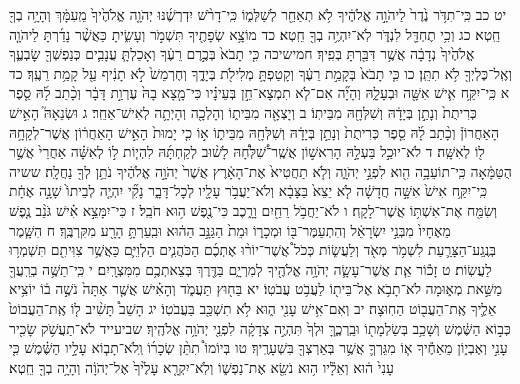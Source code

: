 \documentclass[twoside, openany, parskip=half, 11pt]{book}
\begin{document}
יט כב כִּֽי־תִדֹּ֥ר נֶ֙דֶר֙ לַיהֹוָ֣ה אֱלֹהֶ֔יךָ לֹ֥א תְאַחֵ֖ר לְשַׁלְּמ֑וֹ כִּֽי־דָרֹ֨שׁ יִדְרְשֶׁ֜נּוּ יְהֹוָ֤ה אֱלֹהֶ֙יךָ֙ מֵֽעִמָּ֔ךְ וְהָיָ֥ה בְךָ֖ חֵֽטְא׃ כג וְכִ֥י תֶחְדַּ֖ל לִנְדֹּ֑ר לֹֽא־יִהְיֶ֥ה בְךָ֖ חֵֽטְא׃ כד מוֹצָ֥א שְׂפָתֶ֖יךָ תִּשְׁמֹ֣ר וְעָשִׂ֑יתָ כַּאֲשֶׁ֨ר נָדַ֜רְתָּ לַיהֹוָ֤ה אֱלֹהֶ֙יךָ֙ נְדָבָ֔ה אֲשֶׁ֥ר דִּבַּ֖רְתָּ בְּפִֽיךָ׃
חמישיכה כִּ֤י תָבֹא֙ בְּכֶ֣רֶם רֵעֶ֔ךָ וְאָכַלְתָּ֧ עֲנָבִ֛ים כְּנַפְשְׁךָ֖ שׇׂבְעֶ֑ךָ וְאֶֽל־כֶּלְיְךָ֖ לֹ֥א תִתֵּֽן׃
כו כִּ֤י תָבֹא֙ בְּקָמַ֣ת רֵעֶ֔ךָ וְקָטַפְתָּ֥ מְלִילֹ֖ת בְּיָדֶ֑ךָ וְחֶרְמֵשׁ֙ לֹ֣א תָנִ֔יף עַ֖ל קָמַ֥ת רֵעֶֽךָ׃
כד א כִּֽי־יִקַּ֥ח אִ֛ישׁ אִשָּׁ֖ה וּבְעָלָ֑הּ וְהָיָ֞ה אִם־לֹ֧א תִמְצָא־חֵ֣ן בְּעֵינָ֗יו כִּי־מָ֤צָא בָהּ֙ עֶרְוַ֣ת דָּבָ֔ר וְכָ֨תַב לָ֜הּ סֵ֤פֶר כְּרִיתֻת֙ וְנָתַ֣ן בְּיָדָ֔הּ וְשִׁלְּחָ֖הּ מִבֵּיתֽוֹ׃ ב וְיָצְאָ֖ה מִבֵּית֑וֹ וְהָלְכָ֖ה וְהָיְתָ֥ה לְאִישׁ־אַחֵֽר׃ ג וּשְׂנֵאָהּ֮ הָאִ֣ישׁ הָאַחֲרוֹן֒ וְכָ֨תַב לָ֜הּ סֵ֤פֶר כְּרִיתֻת֙ וְנָתַ֣ן בְּיָדָ֔הּ וְשִׁלְּחָ֖הּ מִבֵּית֑וֹ א֣וֹ כִ֤י יָמוּת֙ הָאִ֣ישׁ הָאַחֲר֔וֹן אֲשֶׁר־לְקָחָ֥הּ ל֖וֹ לְאִשָּֽׁה׃ ד לֹא־יוּכַ֣ל בַּעְלָ֣הּ הָרִאשׁ֣וֹן אֲשֶֽׁר־שִׁ֠לְּחָ֠הּ לָשׁ֨וּב לְקַחְתָּ֜הּ לִהְי֧וֹת ל֣וֹ לְאִשָּׁ֗ה אַחֲרֵי֙ אֲשֶׁ֣ר הֻטַּמָּ֔אָה כִּֽי־תוֹעֵבָ֥ה הִ֖וא לִפְנֵ֣י יְהֹוָ֑ה וְלֹ֤א תַחֲטִיא֙ אֶת־הָאָ֔רֶץ אֲשֶׁר֙ יְהֹוָ֣ה אֱלֹהֶ֔יךָ נֹתֵ֥ן לְךָ֖ נַחֲלָֽה׃
ששיה כִּֽי־יִקַּ֥ח אִישׁ֙ אִשָּׁ֣ה חֲדָשָׁ֔ה לֹ֤א יֵצֵא֙ בַּצָּבָ֔א וְלֹא־יַעֲבֹ֥ר עָלָ֖יו לְכׇל־דָּבָ֑ר נָקִ֞י יִהְיֶ֤ה לְבֵיתוֹ֙ שָׁנָ֣ה אֶחָ֔ת וְשִׂמַּ֖ח אֶת־אִשְׁתּ֥וֹ אֲשֶׁר־לָקָֽח׃ ו לֹא־יַחֲבֹ֥ל רֵחַ֖יִם וָרָ֑כֶב כִּי־נֶ֖פֶשׁ ה֥וּא חֹבֵֽל׃
ז כִּי־יִמָּצֵ֣א אִ֗ישׁ גֹּנֵ֨ב נֶ֤פֶשׁ מֵאֶחָיו֙ מִבְּנֵ֣י יִשְׂרָאֵ֔ל וְהִתְעַמֶּר־בּ֖וֹ וּמְכָר֑וֹ וּמֵת֙ הַגַּנָּ֣ב הַה֔וּא וּבִֽעַרְתָּ֥ הָרָ֖ע מִקִּרְבֶּֽךָ׃
ח הִשָּׁ֧מֶר בְּנֶֽגַע־הַצָּרַ֛עַת לִשְׁמֹ֥ר מְאֹ֖ד וְלַעֲשׂ֑וֹת כְּכֹל֩ אֲשֶׁר־יוֹר֨וּ אֶתְכֶ֜ם הַכֹּהֲנִ֧ים הַלְוִיִּ֛ם כַּאֲשֶׁ֥ר צִוִּיתִ֖ם תִּשְׁמְר֥וּ לַעֲשֽׂוֹת׃ ט זָכ֕וֹר אֵ֧ת אֲשֶׁר־עָשָׂ֛ה יְהֹוָ֥ה אֱלֹהֶ֖יךָ לְמִרְיָ֑ם בַּדֶּ֖רֶךְ בְּצֵאתְכֶ֥ם מִמִּצְרָֽיִם׃
י כִּֽי־תַשֶּׁ֥ה בְרֵֽעֲךָ֖ מַשַּׁ֣את מְא֑וּמָה לֹא־תָבֹ֥א אֶל־בֵּית֖וֹ לַעֲבֹ֥ט עֲבֹטֽוֹ׃ יא בַּח֖וּץ תַּעֲמֹ֑ד וְהָאִ֗ישׁ אֲשֶׁ֤ר אַתָּה֙ נֹשֶׁ֣ה ב֔וֹ יוֹצִ֥יא אֵלֶ֛יךָ אֶֽת־הַעֲב֖וֹט הַחֽוּצָה׃ יב וְאִם־אִ֥ישׁ עָנִ֖י ה֑וּא לֹ֥א תִשְׁכַּ֖ב בַּעֲבֹטֽוֹ׃ יג הָשֵׁב֩ תָּשִׁ֨יב ל֤וֹ אֶֽת־הַעֲבוֹט֙ כְּב֣וֹא הַשֶּׁ֔מֶשׁ וְשָׁכַ֥ב בְּשַׂלְמָת֖וֹ וּבֵֽרְכֶ֑ךָּ וּלְךָ֙ תִּהְיֶ֣ה צְדָקָ֔ה לִפְנֵ֖י יְהֹוָ֥ה אֱלֹהֶֽיךָ׃
שביעייד לֹא־תַעֲשֹׁ֥ק שָׂכִ֖יר עָנִ֣י וְאֶבְי֑וֹן מֵאַחֶ֕יךָ א֧וֹ מִגֵּרְךָ֛ אֲשֶׁ֥ר בְּאַרְצְךָ֖ בִּשְׁעָרֶֽיךָ׃ טו בְּיוֹמוֹ֩ תִתֵּ֨ן שְׂכָר֜וֹ וְֽלֹא־תָב֧וֹא עָלָ֣יו הַשֶּׁ֗מֶשׁ כִּ֤י עָנִי֙ ה֔וּא וְאֵלָ֕יו ה֥וּא נֹשֵׂ֖א אֶת־נַפְשׁ֑וֹ וְלֹֽא־יִקְרָ֤א עָלֶ֙יךָ֙ אֶל־יְהֹוָ֔ה וְהָיָ֥ה בְךָ֖ חֵֽטְא׃
\end{document}
